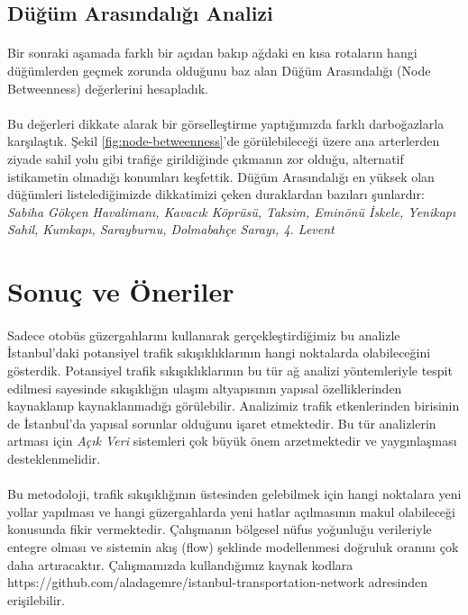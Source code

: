 \documentclass[10pt,a4paper,twocolumn]{article}
\begin{document}
\subsection{Düğüm Arasındalığı Analizi}
\paragraph{} Bir sonraki aşamada farklı bir açıdan bakıp ağdaki en kısa rotaların hangi düğümlerden geçmek zorunda olduğunu baz alan Düğüm Arasındalığı (Node Betweenness) değerlerini hesapladık. 

\paragraph{} Bu değerleri dikkate alarak bir görselleştirme yaptığımızda farklı darboğazlarla karşılaştık. Şekil \ref{fig:node-betweenness}'de görülebileceği üzere ana arterlerden ziyade sahil yolu gibi trafiğe girildiğinde çıkmanın zor olduğu, alternatif istikametin olmadığı konumları keşfettik. Düğüm Arasındalığı en yüksek olan düğümleri listelediğimizde dikkatimizi çeken duraklardan bazıları şunlardır: \textit{Sabiha Gökçen Havalimanı, Kavacık Köprüsü, Taksim, Eminönü İskele, Yenikapı Sahil, Kumkapı, Sarayburnu, Dolmabahçe Sarayı, 4. Levent}

\section{Sonuç ve Öneriler}
\paragraph{} Sadece otobüs güzergahlarını kullanarak gerçekleştirdiğimiz bu analizle İstanbul'daki potansiyel trafik sıkışıklıklarının hangi noktalarda olabileceğini gösterdik. Potansiyel trafik sıkışıklıklarının bu tür ağ analizi yöntemleriyle tespit edilmesi sayesinde sıkışıklığın ulaşım altyapısının yapısal özelliklerinden kaynaklanıp kaynaklanmadığı görülebilir. Analizimiz trafik etkenlerinden birisinin de İstanbul'da yapısal sorunlar olduğunu işaret etmektedir. Bu tür analizlerin artması için \textit{Açık Veri} sistemleri çok büyük önem arzetmektedir ve yaygınlaşması desteklenmelidir.

\paragraph{} Bu metodoloji, trafik sıkışıklığının üstesinden gelebilmek için hangi noktalara yeni yollar yapılması ve hangi güzergahlarda yeni hatlar açılmasının makul olabileceği konusunda fikir vermektedir. Çalışmanın bölgesel nüfus yoğunluğu verileriyle entegre olması ve sistemin akış (flow) şeklinde modellenmesi doğruluk oranını çok daha artıracaktır. Çalışmamızda kullandığımız kaynak kodlara https://github.com/aladagemre/istanbul-transportation-network adresinden erişilebilir.
\end{document}
